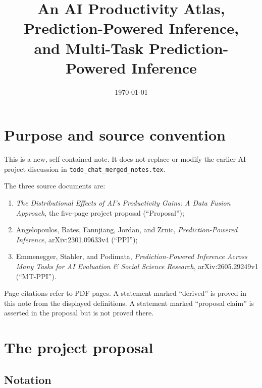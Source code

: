 \documentclass[11pt]{article}
\title{An AI Productivity Atlas, Prediction-Powered Inference,\\
  and Multi-Task Prediction-Powered Inference}
\author{}
\date{\today}
\begin{document}
  \maketitle
  
  \section*{Purpose and source convention}
  
  This is a new, self-contained note. It does not replace or modify the earlier
  AI-project discussion in \texttt{todo\_chat\_merged\_notes.tex}.
  
  The three source documents are:
  \begin{enumerate}[leftmargin=2em]
      \item \emph{The Distributional Effects of AI's Productivity Gains: A Data
      Fusion Approach}, the five-page project proposal (``Proposal'');
      \item Angelopoulos, Bates, Fannjiang, Jordan, and Zrnic,
      \emph{Prediction-Powered Inference}, arXiv:2301.09633v4 (``PPI'');
      \item Emmenegger, Stahler, and Podimata,
      \emph{Prediction-Powered Inference Across Many Tasks for AI Evaluation
      \& Social Science Research}, arXiv:2605.29249v1 (``MT-PPI'').
  \end{enumerate}
  Page citations refer to PDF pages. A statement marked ``derived'' is proved in
  this note from the displayed definitions. A statement marked ``proposal
  claim'' is asserted in the proposal but is not proved there.
  
  \section{The project proposal}
  
  \subsection*{Notation}
  
\end{document}
